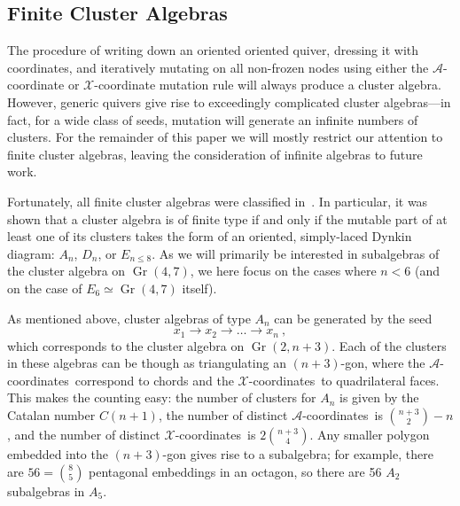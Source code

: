 \documentclass[12pt]{article}
\DeclareMathOperator{\Gr}{Gr}
\def\x{\mathcal{X}}
\def\xcoords{$\mathcal{X}$-coordinates}
\def\a{\mathcal{A}}
\def\acoords{$\mathcal{A}$-coordinates}
\begin{document}
\subsection{Finite Cluster Algebras}\label{sec:finite-algebras}

The procedure of writing down an oriented oriented quiver, dressing it with coordinates, and iteratively mutating on all non-frozen nodes using either the $\a$-coordinate or $\x$-coordinate mutation rule will always produce a cluster algebra. However, generic quivers give rise to exceedingly complicated cluster algebras---in fact, for a wide class of seeds, mutation will generate an infinite numbers of clusters. For the remainder of this paper we will mostly restrict our attention to finite cluster algebras, leaving the consideration of infinite algebras to future work. 

Fortunately, all finite cluster algebras were classified in~\cite{1054.17024}. In particular, it was shown that a cluster algebra is of finite type if and only if the mutable part of at least one of its clusters takes the form of an oriented, simply-laced Dynkin diagram: $A_n$, $D_n$, or $E_{n\le8}$.  As we will primarily be interested in subalgebras of the cluster algebra on $\Gr(4,7)$, we here focus on the cases where $n < 6$ (and on the case of $E_6 \simeq \Gr(4,7)$ itself). 

As mentioned above, cluster algebras of type $A_n$ can be generated by the seed
\begin{equation}\label{def:An}
  x_1\to x_2\to \ldots \to x_n \ ,
\end{equation}
which corresponds to the cluster algebra on $\Gr(2,n{+}3)$. Each of the clusters in these algebras can be though as triangulating an $(n+3)$-gon, where the \acoords\ correspond to chords and the \xcoords\ to quadrilateral faces. This makes the counting easy: the number of clusters for $A_n$ is given by the Catalan number $C(n+1)$, the number of distinct \acoords\ is $\binom{n+3}{2}-n$, and the number of distinct \xcoords\ is $2\binom{n+3}{4}$. Any smaller polygon embedded into the $(n+3)$-gon gives rise to a subalgebra; for example, there are $56=\binom{8}{5}$ pentagonal embeddings in an octagon, so there are 56 $A_2$ subalgebras in $A_5$. 
\end{document}
